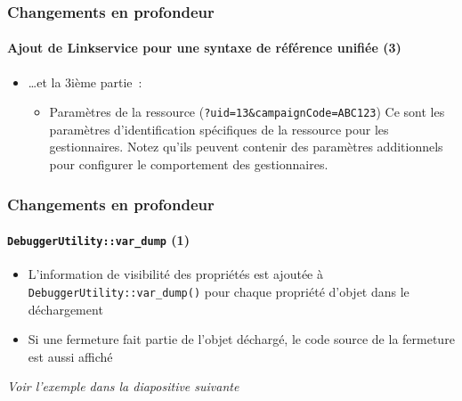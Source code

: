 \begin{frame}[fragile]
	\frametitle{Changements en profondeur}
	\framesubtitle{Ajout de Linkservice pour une syntaxe de référence unifiée (3)}

	\begin{itemize}

		\item …et la 3ième partie~:

			\begin{itemize}

				\item Paramètres de la ressource (\texttt{?uid=13\&campaignCode=ABC123})\newline
					Ce sont les paramètres d'identification spécifiques de la ressource pour les gestionnaires.
					Notez qu'ils peuvent contenir des paramètres additionnels pour configurer le comportement des
					gestionnaires.

			\end{itemize}

	\end{itemize}

\end{frame}

\begin{frame}[fragile]
	\frametitle{Changements en profondeur}
	\framesubtitle{\texttt{DebuggerUtility::var\_dump} (1)}

	\begin{itemize}

		\item L'information de visibilité des propriétés est ajoutée à \texttt{DebuggerUtility::var\_dump()}
			\newline
			pour chaque propriété d'objet dans le déchargement

		\item Si une fermeture fait partie de l'objet déchargé, le code source de la fermeture est aussi affiché

	\end{itemize}

	\tabto{0.75cm}\textit{Voir l'exemple dans la diapositive suivante}

\end{frame}

